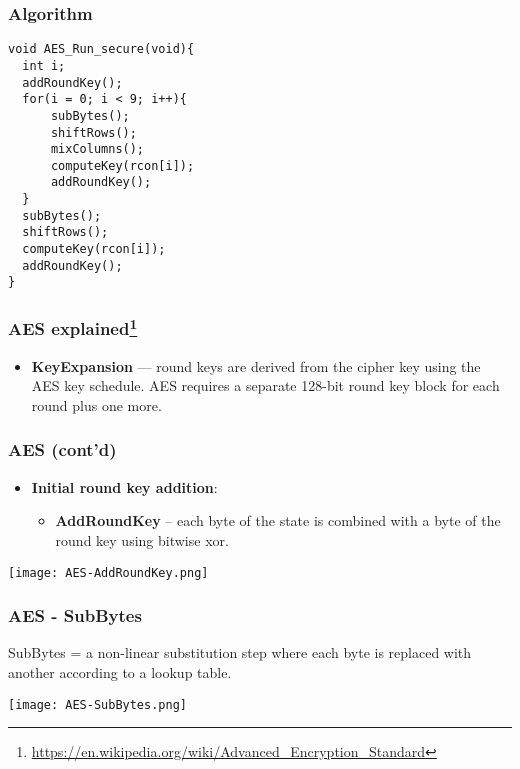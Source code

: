 \documentclass[
hyperref={pdfpagelabels=false}
,xcolor=table
]
{beamer}
\begin{document}
\begin{frame}[fragile]
  \frametitle{Algorithm}
\begin{verbatim}
void AES_Run_secure(void){
  int i;
  addRoundKey();
  for(i = 0; i < 9; i++){
      subBytes();
      shiftRows();
      mixColumns();
      computeKey(rcon[i]);
      addRoundKey();
  }
  subBytes();
  shiftRows();
  computeKey(rcon[i]);
  addRoundKey();
}
\end{verbatim}
\end{frame}




\begin{frame}[fragile]
  \frametitle{AES explained\footnote{\url{https://en.wikipedia.org/wiki/Advanced_Encryption_Standard}}}

  \begin{itemize}
  \item \textbf{KeyExpansion} --- round keys are derived from the
    cipher key using the AES key schedule. AES requires a separate
    128-bit round key block for each round plus one more.
  \end{itemize}
\end{frame}



\begin{frame}[fragile]
  \frametitle{AES (cont'd)}
  \begin{itemize}
  \item \textbf{Initial round key addition}:

    \begin{itemize}
    \item \textbf{AddRoundKey} – each byte of the state is combined with a byte
      of the round key using bitwise xor.
    \end{itemize}
  \end{itemize}

  \begin{center}
  \texttt{[image: AES-AddRoundKey.png]}
\end{center}
  
  
\end{frame}



\begin{frame}
  \frametitle{AES - SubBytes}

  SubBytes = a non-linear substitution step where each byte is
  replaced with another according to a lookup table.

  \begin{center}
    \texttt{[image: AES-SubBytes.png]}
  \end{center}
 
\end{frame}
\end{document}
